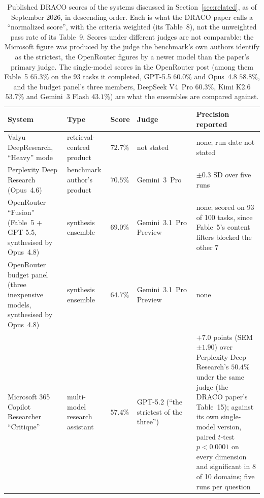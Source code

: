 \documentclass[11pt]{article}
\begin{document}
\begin{table}[h]
\centering
\small
\begin{tabular}{>{\raggedright\arraybackslash}p{3.6cm}>{\raggedright\arraybackslash}p{2.6cm}p{1.3cm}>{\raggedright\arraybackslash}p{2.4cm}>{\raggedright\arraybackslash}p{4.2cm}}
\toprule
System & Type & Score & Judge & Precision reported \\
\midrule
Valyu DeepResearch, ``Heavy'' mode \citep{valyu2026} & retrieval-centred product & $72.7\%$ & not stated & none; run date not stated \\
Perplexity Deep Research (Opus~4.6) \citep{draco2026} & benchmark author's product & $70.5\%$ & Gemini~3~Pro & $\pm 0.3$ SD over five runs \\
OpenRouter ``Fusion'' (Fable~5 + GPT-5.5, synthesised by Opus~4.8) \citep{openrouterfusion2026} & synthesis ensemble & $69.0\%$ & Gemini~3.1~Pro Preview & none; scored on 93 of 100 tasks, since Fable~5's content filters blocked the other 7 \\
OpenRouter budget panel (three inexpensive models, synthesised by Opus~4.8) \citep{openrouterfusion2026} & synthesis ensemble & $64.7\%$ & Gemini~3.1~Pro Preview & none \\
Microsoft 365 Copilot Researcher ``Critique'' \citep{msftdraco2026, computerworld2026msft} & multi-model research assistant & $57.4\%$ & GPT-5.2 (``the strictest of the three'') & $+7.0$ points (SEM $\pm 1.90$) over Perplexity Deep Research's $50.4\%$ under the same judge (the DRACO paper's Table~15); against its own single-model version, paired $t$-test $p < 0.0001$ on every dimension and significant in 8 of 10 domains; five runs per question \\
\bottomrule
\end{tabular}
\caption{Published DRACO scores of the systems discussed in Section~\ref{sec:related}, as of September 2026, in descending order. Each is what the DRACO paper calls a ``normalized score'', with the criteria weighted (its Table~8), not the unweighted pass rate of its Table~9. Scores under
different judges are not comparable: the Microsoft figure was produced by the judge the
benchmark's own authors identify as the strictest, the OpenRouter figures by a newer
model than the paper's primary judge. The single-model scores in the OpenRouter post
(among them Fable~5 $65.3\%$ on the 93 tasks it completed, GPT-5.5 $60.0\%$ and Opus~4.8 $58.8\%$, and the budget panel's three members, DeepSeek V4~Pro $60.3\%$, Kimi K2.6 $53.7\%$ and Gemini~3 Flash $43.1\%$) are what the
ensembles are compared against.}
\label{tab:published}
\end{table}
\end{document}
